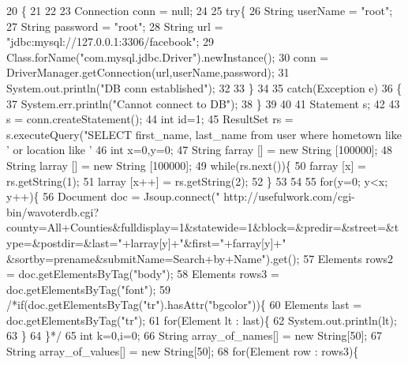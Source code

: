 \begin{DoxyCode}
20                                                            \{
21 
22     
23     Connection conn = null;
24     
25     \textcolor{keywordflow}{try}\{
26         String userName = \textcolor{stringliteral}{"root"};
27         String password = \textcolor{stringliteral}{"root"};
28         String url = \textcolor{stringliteral}{"jdbc:mysql://127.0.0.1:3306/facebook"};
29             Class.forName(\textcolor{stringliteral}{"com.mysql.jdbc.Driver"}).newInstance();
30             conn = DriverManager.getConnection(url,userName,password);
31             System.out.println(\textcolor{stringliteral}{"DB conn established"});
32 
33     \}
34 
35     \textcolor{keywordflow}{catch}(Exception e)
36     \{
37         System.err.println(\textcolor{stringliteral}{"Cannot connect to DB"});
38     \}
39     
40     
41     Statement s;
42     
43     s = conn.createStatement();
44     \textcolor{keywordtype}{int} \textcolor{keywordtype}{id}=1;
45     ResultSet rs = s.executeQuery(\textcolor{stringliteral}{"SELECT first\_name, last\_name from user where hometown like '%
       or location like '%
46     \textcolor{keywordtype}{int} x=0,y=0;
47     String farray [] = \textcolor{keyword}{new} String [100000];
48     String larray [] = \textcolor{keyword}{new} String [100000];
49     \textcolor{keywordflow}{while}(rs.next())\{
50     farray [x] = rs.getString(1);
51     larray [x++] = rs.getString(2);
52     \}
53     
54     
55     \textcolor{keywordflow}{for}(y=0; y<x; y++)\{
56     Document doc = Jsoup.connect(\textcolor{stringliteral}{"
      http://usefulwork.com/cgi-bin/wavoterdb.cgi?county=All+Counties&fulldisplay=1&statewide=1&block=&predir=&street=&type=&postdir=&last="}+larray[y]+\textcolor{stringliteral}{"&first="}+farray[y]+\textcolor{stringliteral}{"
      &sortby=prename&submitName=Search+by+Name"}).get();
57     Elements rows2 = doc.getElementsByTag(\textcolor{stringliteral}{"body"});
58     Elements rows3 = doc.getElementsByTag(\textcolor{stringliteral}{"font"});
59     \textcolor{comment}{/*if(doc.getElementsByTag("tr").hasAttr("bgcolor"))\{}
60 \textcolor{comment}{    Elements last = doc.getElementsByTag("tr");}
61 \textcolor{comment}{    for(Element lt : last)\{}
62 \textcolor{comment}{        System.out.println(lt);}
63 \textcolor{comment}{    \}}
64 \textcolor{comment}{    \}*/}
65     \textcolor{keywordtype}{int} k=0,i=0;
66     String array\_of\_names[] = \textcolor{keyword}{new} String[50];
67     String array\_of\_values[] = \textcolor{keyword}{new} String[50];
68     \textcolor{keywordflow}{for}(Element row : rows3)\{
}
\end{DoxyCode}
